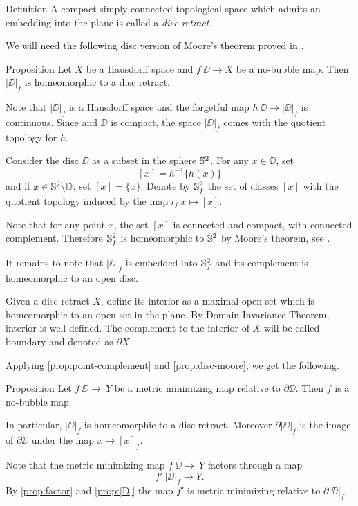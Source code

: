 \documentclass[a4paper,10pt]{amsart}
\begin{document}
\begin{thm}{Definition}
A compact simply connected topological space which admits an embedding into the plane is 
called a \emph{disc retract}. 
\end{thm}




We will need the following disc version of Moore's theorem proved in \cite{moore}.

\begin{thm}{Proposition}\label{prop:disc-moore}
Let $X$ be a Hausdorff space and
$f\:\DD\to X$ be a no-bubble map.
Then $|\DD|_f$ is homeomorphic to a disc retract.
\end{thm}


Note that $|\DD|_f$ is a Hausdorff space
and the forgetful map $h\:\DD\to |\DD|_f$ is continuous.
Since and $\DD$ is compact, the space $|\DD|_f$ comes with the quotient topology for $h$. 

Consider the disc $\DD$ as a subset in the sphere $\mathbb{S}^2$.
For any $x\in \DD$, set 
\[[x]=h^{-1}\{h(x)\}\]
and
if $x\in \mathbb{S}^2\backslash \mathbb{D}$, set $[x]=\{x\}$.
Denote by $\mathbb{S}^2_f$ the set of classes $[x]$ with the quotient topology induced by the map $\iota_f\:x\mapsto [x]$.

Note that for any point $x$, the set $[x]$ is connected and compact, with connected complement.
Therefore $\mathbb{S}^2_f$ is homeomorphic to $\mathbb{S}^2$ by Moore's theorem, see \cite{moore}.

It remains to note that $|\DD|_f$ is embedded into $\mathbb{S}^2_f$ and its complement is homeomorphic to an open disc.\qeds

Given a disc retract $X$,
define its interior as a maximal open set which is homeomorphic to an open set in the plane.
By Domain Invariance Theorem, interior is well defined.
The complement to the interior of $X$ will be called boundary and denoted as $\partial X$.

Applying \ref{prop:point-complement} and \ref{prop:disc-moore}, we get the following.

\begin{thm}{Proposition}\label{prop:|D|}
Let $f\:\DD\to\ Y$ be a metric minimizing map relative to $\partial \DD$.
Then $f$ is a no-bubble map.

In particular,  $|\DD|_f$ is homeomorphic to a disc retract.
Moreover $\partial|\DD|_f$ is the image of $\partial \DD$
under the map $x\mapsto [x]_f$.
\end{thm}

Note that the metric minimizing map $f\:\DD\to\ Y$ factors through a map \[f'\:|\DD|_f\to Y.\]
By \ref{prop:factor} and \ref{prop:|D|} 
the map $f'$
is metric minimizing relative to $\partial|\DD|_f$.
\end{document}
